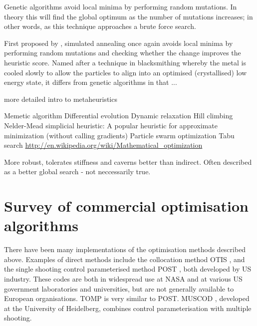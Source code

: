 Genetic algorithms avoid local minima by performing random mutations. In theory this will find the global optimum as the number of mutations increases; in other words, as this technique approaches a brute force search.

First proposed by \textcite{Kirkpatrick1983}, simulated annealing once again avoids local minima by performing random mutations and checking whether the change improves the heuristic score. Named after a technique in blacksmithing whereby the metal is cooled slowly to allow the particles to align into an optimised (crystallised) low energy state, it differs from genetic algorithms in that ...

\textcite{Dreo2006} more detailed intro to metaheuristics

Memetic algorithm
Differential evolution
Dynamic relaxation
Hill climbing
Nelder-Mead simplicial heuristic: A popular heuristic for approximate minimization (without calling gradients)
Particle swarm optimization
Tabu search
\url{http://en.wikipedia.org/wiki/Mathematical_optimization}

More robust, tolerates stiffness and caverns better than indirect. Often described as a better global search - not neccessarily true.


\section{Survey of commercial optimisation algorithms} \label{sec:Algorithms}

There have been many implementations of the optimisation methods described above. Examples of direct methods include the collocation method OTIS \parencite[Optimal Trajectories by Implicit Simulation, ][]{Hargraves1987}, and the single shooting control parameterised method POST \parencite[Program to Optimize Simulated Trajectories, ][]{Brauer1977}, both developed by US industry. These codes are both in widespread use at NASA and at various US government laboratories and universities, but are not generally available to European organisations. TOMP \parencite[Trajectory Optimization by Mathematical Programming, ][]{Kraft1994} is very similar to POST. MUSCOD \parencite[Multiple Shooting Code for optimization, ][]{Bock1984}, developed at the University of Heidelberg, combines control parameterisation with multiple shooting. 

